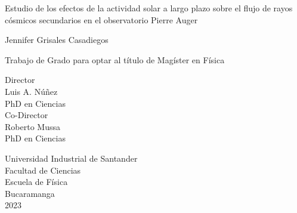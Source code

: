 
\begin{center}

Estudio de los efectos de la actividad solar a largo plazo sobre el flujo de rayos cósmicos secundarios en el observatorio Pierre Auger \vspace{1.5cm}

Jennifer Grisales Casadiegos\\ \vspace{1.5cm}

Trabajo de Grado para optar al título de Magíster en Física\\ \vspace{0.5cm}

Director\\
Luis A. Núñez\\
PhD en Ciencias\\ \vspace{1cm}
Co-Director\\
Roberto Mussa\\
PhD en Ciencias \vspace{1.5cm}

Universidad Industrial de Santander\\
Facultad de Ciencias\\
Escuela de Física\\
Bucaramanga\\
2023\\

\end{center}
